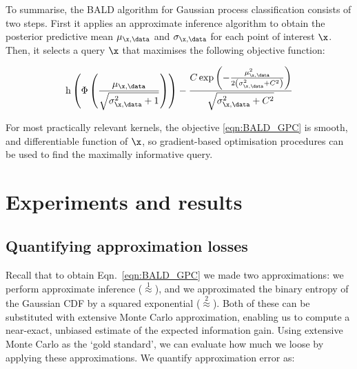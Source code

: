 To summarise, the BALD algorithm for Gaussian process classification consists of two steps. First it applies an approximate inference algorithm to obtain the posterior predictive mean $\mu_{\x,\data}$ and $\sigma_{\x,\data}$ for each point of interest $\x$. Then, it selects a query $\x$ that maximises the following objective function:

\begin{equation}
	\mathrm{h} \left( \Phi\left( \frac{\mu_{\x,\data}}{\sqrt{\sigma^2_{\x,\data} + 1}} \right)\right) - \frac{C \exp\left(-\frac{\mu_{\x,\data}^2}{2\left(\sigma_{\x,\data}^2 + C^2\right)}\right)}{\sqrt{\sigma_{\x,\data}^2 + C^2}} \label{eqn:BALD_GPC}
\end{equation}

For most practically relevant kernels, the objective \eqref{eqn:BALD_GPC} is smooth, and differentiable function of $\x$, so gradient-based optimisation procedures can be used to find the maximally informative query.
	

\section{Experiments and results}

\subsection{Quantifying approximation losses}

Recall that to obtain Eqn.\ \eqref{eqn:BALD_GPC} we made two approximations: we perform approximate inference ({\scriptsize $\stackrel{1}{\approx}$}), and we approximated the binary entropy of the Gaussian CDF by a squared exponential ({\scriptsize $\stackrel{2}{\approx}$}). Both of these can be substituted with extensive Monte Carlo approximation, enabling us to compute a near-exact, unbiased estimate of the expected information gain. Using extensive Monte Carlo as the `gold standard', we can evaluate how much we loose by applying these approximations. We quantify approximation error as: 

